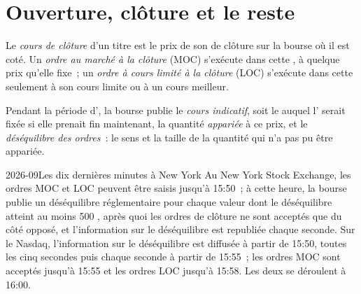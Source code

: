 \section{Ouverture, clôture et le reste}

\begin{definition}\label{def:m1:auctions:moc}
Le \emph{cours de clôture} d'un titre est le prix de
son  de clôture sur la bourse où il est coté. Un
\emph{ordre au marché à la clôture} (MOC) s'exécute dans
cette , à quelque prix qu'elle fixe~; un
\emph{ordre à cours limité à la clôture} (LOC) s'exécute dans cette 
seulement à son cours limite ou à un cours meilleur.
\end{definition}

\begin{definition}\label{def:m1:auctions:imbalance}
Pendant la période d', la bourse publie le
\emph{cours indicatif}, soit le 
auquel l' serait fixée si elle prenait fin maintenant, la quantité \emph{appariée} à ce
prix, et le \emph{déséquilibre des ordres}~: le sens et
la taille de la quantité qui n'a pas pu être appariée.
\end{definition}

\begin{dated}{2026-09}{Les dix dernières minutes à New York}\label{dat:m1:auctions:us}
Au New York Stock Exchange, les ordres MOC et LOC peuvent être saisis
jusqu'à 15:50~; à cette heure, la bourse publie un déséquilibre réglementaire pour chaque
valeur dont le déséquilibre atteint au moins 500 , après quoi les ordres de clôture
ne sont acceptés que du côté opposé, et l'information sur le déséquilibre est
republiée chaque seconde. Sur le Nasdaq, l'information sur le déséquilibre est diffusée
à partir de 15:50, toutes les cinq secondes puis chaque seconde à partir de 15:55~; les ordres MOC
sont acceptés jusqu'à 15:55 et les ordres LOC jusqu'à 15:58. Les deux  se déroulent à
16:00.
\end{dated}

